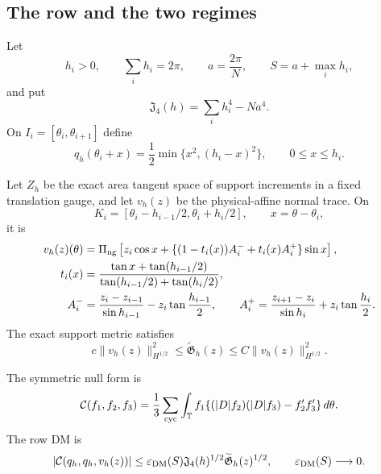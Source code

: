 \documentclass[11pt]{amsart}
\numberwithin{equation}{section}
\theoremstyle{definition}
\theoremstyle{remark}
\newcommand{\T}{\mathbb T}
\newcommand{\PiNG}{\Pi_{\rm ng}}
\newcommand{\Jfour}{\mathfrak J_4}
\newcommand{\Gtilde}{\widetilde{\mathfrak G}}
\newcommand{\Cnull}{\mathcal C}
\begin{document}
\subsection{The row and the two regimes}

Let
\begin{equation}\label{PT:eq:fan}
 h_i>0,\qquad \sum_i h_i=2\pi,\qquad
 a=\frac{2\pi}{N},\qquad S=a+\max_i h_i,
\end{equation}
and put
\begin{equation}\label{PT:eq:J}
 \Jfour(h)=\sum_i h_i^4-Na^4.
\end{equation}
On $I_i=[\theta_i,\theta_{i+1}]$ define
\begin{equation}\label{PT:eq:q}
 q_h(\theta_i+x)=\frac12\min\{x^2,(h_i-x)^2\},
 \qquad0\le x\le h_i.
\end{equation}

Let $Z_h$ be the exact area tangent space of support increments in a fixed
translation gauge, and let $v_h(z)$ be the physical-affine normal trace.
On
\[
 K_i=[\theta_i-h_{i-1}/2,\theta_i+h_i/2],\qquad x=\theta-\theta_i,
\]
it is
\begin{align}
 v_h(z)(\theta)
 &=\PiNG\left[z_i\cos x+
 \{(1-t_i(x))A_i^-+t_i(x)A_i^+\}\sin x\right],
 \label{PT:eq:trace}\\
 t_i(x)&=\frac{\tan x+\tan(h_{i-1}/2)}
 {\tan(h_{i-1}/2)+\tan(h_i/2)},\notag\\
 A_i^-&=\frac{z_i-z_{i-1}}{\sin h_{i-1}}
       -z_i\tan\frac{h_{i-1}}2,\qquad
 A_i^+=\frac{z_{i+1}-z_i}{\sin h_i}
       +z_i\tan\frac{h_i}2.\notag
\end{align}
The exact support metric satisfies
\begin{equation}\label{PT:eq:metric}
 c\|v_h(z)\|_{H^{1/2}}^2
 \le\Gtilde_h(z)\le C\|v_h(z)\|_{H^{1/2}}^2.
\end{equation}

The symmetric null form is
\begin{equation}\label{PT:eq:null}
 \Cnull(f_1,f_2,f_3)
 =\frac13\sum_{\rm cyc}\int_\T f_1
 \{(|D|f_2)(|D|f_3)-f_2'f_3'\}\,d\theta.
\end{equation}
The row DM is
\begin{equation}\label{PT:eq:DM-target}
 |\Cnull(q_h,q_h,v_h(z))|
 \le\varepsilon_{\rm DM}(S)\Jfour(h)^{1/2}
       \Gtilde_h(z)^{1/2},
 \qquad\varepsilon_{\rm DM}(S)\longrightarrow0.
\end{equation}
\end{document}
